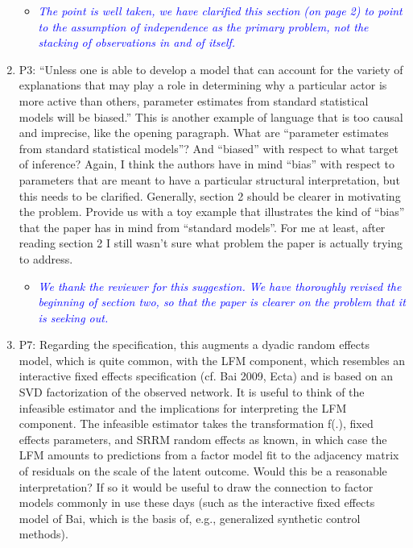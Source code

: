 \begin{enumerate}
	\begin{itemize}
		\item \textcolor{blue}{ \emph{
		 The point is well taken, we have clarified this section (on page 2) to point to the assumption of independence as the primary problem, not the stacking of observations in and of itself.
		}}
	\end{itemize}
	\item P3: “Unless one is able to develop a model that can account for the variety of explanations that may play a role in determining why a particular actor is more active than others, parameter estimates from standard statistical models will be biased.” This is another example of language that is too causal and imprecise, like the opening paragraph. What are “parameter estimates from standard statistical models”?  And “biased” with respect to what target of inference? Again, I think the authors have in mind “bias” with respect to parameters that are meant to have a particular structural interpretation, but this needs to be clarified. Generally, section 2 should be clearer in motivating the problem.  Provide us with a toy example that illustrates the kind of “bias” that the paper has in mind from “standard models”.  For me at least, after reading section 2 I still wasn’t sure what problem the paper is actually trying to address.
	\begin{itemize}
		\item \textcolor{blue}{ \emph{
		We thank the reviewer for this suggestion. We have thoroughly revised the beginning of section two, so that the paper is clearer on the problem that it is seeking out.
	}}
	\end{itemize}
	\item P7: Regarding the specification, this augments a dyadic random effects model, which is quite common, with  the LFM component, which resembles an interactive fixed effects specification (cf. Bai 2009, Ecta) and is based on an SVD factorization of the observed network. It is useful to think of the infeasible estimator and the implications for interpreting the LFM component.  The infeasible estimator takes the transformation f(.), fixed effects parameters, and SRRM random effects as known, in which case the LFM amounts to predictions from a factor model fit to the adjacency matrix of residuals on the scale of the latent outcome.  Would this be a reasonable interpretation? If so it would be useful to draw the connection to factor models commonly in use these days (such as the interactive fixed effects model of Bai, which is the basis of, e.g., generalized synthetic control methods).

\end{enumerate}
